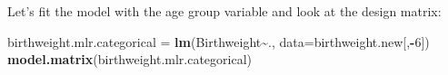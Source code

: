 \documentclass[
]{book}
\newenvironment{Shaded}{\begin{snugshade}}{\end{snugshade}}
\newcommand{\AttributeTok}[1]{\textcolor[rgb]{0.13,0.29,0.53}{#1}}
\newcommand{\DecValTok}[1]{\textcolor[rgb]{0.00,0.00,0.81}{#1}}
\newcommand{\FunctionTok}[1]{\textcolor[rgb]{0.13,0.29,0.53}{\textbf{#1}}}
\newcommand{\NormalTok}[1]{#1}
\newcommand{\OtherTok}[1]{\textcolor[rgb]{0.56,0.35,0.01}{#1}}
\newcommand{\SpecialCharTok}[1]{\textcolor[rgb]{0.81,0.36,0.00}{\textbf{#1}}}
\newcommand{\StringTok}[1]{\textcolor[rgb]{0.31,0.60,0.02}{#1}}
\begin{document}
\begin{Shaded}
\end{Shaded}

Let's fit the model with the age group variable and look at the design matrix:

\begin{Shaded}
\begin{Highlighting}[]
\NormalTok{birthweight.mlr.categorical }\OtherTok{=} \FunctionTok{lm}\NormalTok{(Birthweight}\SpecialCharTok{\textasciitilde{}}\NormalTok{., }\AttributeTok{data=}\NormalTok{birthweight.new[,}\SpecialCharTok{{-}}\DecValTok{6}\NormalTok{])}
\FunctionTok{model.matrix}\NormalTok{(birthweight.mlr.categorical)}
\end{Highlighting}
\end{Shaded}
\end{document}
